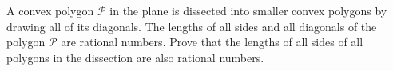 A convex polygon $\mathcal{P}$ in the plane is dissected into smaller convex polygons by drawing all of its diagonals. The lengths of all sides and all diagonals of the polygon $\mathcal{P}$ are rational numbers. Prove that the lengths of all sides of all polygons in the dissection are also rational numbers.